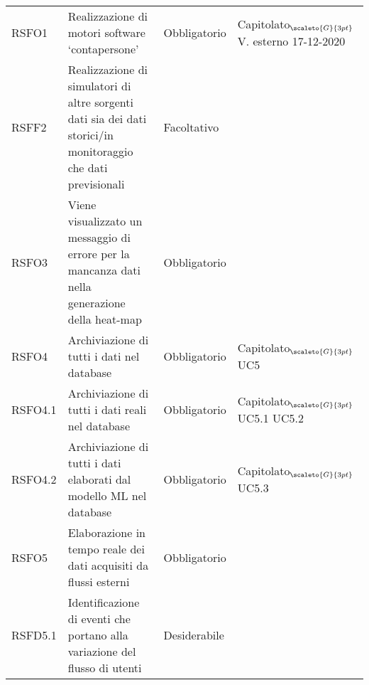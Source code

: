 \def\tabularxcolumn#1{m{#1}}
{

	\begin{center}
		\renewcommand{\arraystretch}{1.4}
		\begin{longtable}{|p{3cm}|p{4cm}|p{4cm}|p{4cm}|}
			\hline
			\rowcolor{airforceblue}
			\makecell[c]{\textbf{Codice RS}} & \makecell[c]{\textbf{Descrizione}} & \makecell[c]{\textbf{Tipo di requisito}} & \makecell[c]{\textbf{Fonte}} \\
			\hline
			\centering RSFO1 & Realizzazione di motori software ‘contapersone’  &\centering  Obbligatorio & \makecell[tc]{Capitolato$_{\scaleto{G}{3pt}}$ \\ V. esterno 17-12-2020 } \\
			\hline
			\centering RSFF2 & Realizzazione di simulatori di altre sorgenti dati sia dei dati storici/in monitoraggio che dati previsionali & \centering Facoltativo & \makecell[tc]{Capitolato$_{\scaleto{G}{3pt}}$ } \\
			\hline
			\centering RSFO3  & Viene visualizzato un messaggio di errore per la mancanza dati nella generazione della heat-map  &\centering  Obbligatorio & \makecell[tc]{UC2}  \\
			\hline
			\centering RSFO4 & Archiviazione di tutti i dati nel database & \centering Obbligatorio & \makecell[tc]{Capitolato$_{\scaleto{G}{3pt}}$ \\ UC5}  \\
			\hline
			\centering RSFO4.1 & Archiviazione di tutti i dati reali nel database & \centering Obbligatorio & \makecell[tc]{Capitolato$_{\scaleto{G}{3pt}}$ \\ UC5.1 \\ UC5.2}  \\
			\hline
			\centering RSFO4.2 & Archiviazione di tutti i dati elaborati dal modello ML nel database & \centering Obbligatorio & \makecell[tc]{Capitolato$_{\scaleto{G}{3pt}}$ \\ UC5.3}  \\
			\hline
			\centering RSFO5 & Elaborazione in tempo reale dei dati acquisiti da flussi esterni &\centering  Obbligatorio & \makecell[tc]{Capitolato$_{\scaleto{G}{3pt}}$}  \\
			\hline
			\centering RSFD5.1 & Identificazione di eventi che portano alla variazione del flusso di utenti &\centering  Desiderabile & \makecell[tc]{Capitolato$_{\scaleto{G}{3pt}}$}  \\

\end{longtable}
\end{center}}
